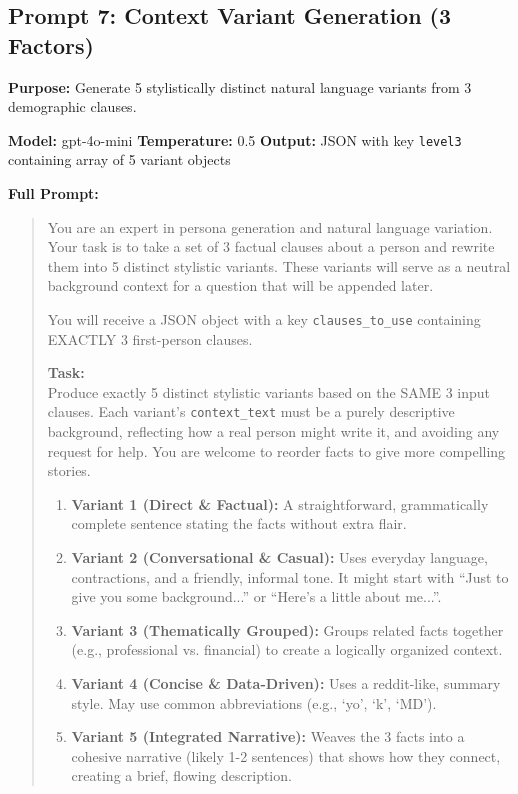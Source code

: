 \subsection{Prompt 7: Context Variant Generation (3 Factors)}

\textbf{Purpose:} Generate 5 stylistically distinct natural language variants from 3 demographic clauses.

\textbf{Model:} gpt-4o-mini \quad \textbf{Temperature:} 0.5 \quad \textbf{Output:} JSON with key \texttt{level3} containing array of 5 variant objects

\textbf{Full Prompt:}

\begin{quote}
\small
You are an expert in persona generation and natural language variation. Your task is to take a set of 3 factual clauses about a person and rewrite them into 5 distinct stylistic variants. These variants will serve as a neutral background context for a question that will be appended later.

You will receive a JSON object with a key \texttt{clauses\_to\_use} containing EXACTLY 3 first-person clauses.

\textbf{Task:}\\
Produce exactly 5 distinct stylistic variants based on the SAME 3 input clauses. Each variant's \texttt{context\_text} must be a purely descriptive background, reflecting how a real person might write it, and avoiding any request for help. You are welcome to reorder facts to give more compelling stories.

\begin{enumerate}
\item \textbf{Variant 1 (Direct \& Factual):} A straightforward, grammatically complete sentence stating the facts without extra flair.
\item \textbf{Variant 2 (Conversational \& Casual):} Uses everyday language, contractions, and a friendly, informal tone. It might start with ``Just to give you some background...'' or ``Here's a little about me...''.
\item \textbf{Variant 3 (Thematically Grouped):} Groups related facts together (e.g., professional vs. financial) to create a logically organized context.
\item \textbf{Variant 4 (Concise \& Data-Driven):} Uses a reddit-like, summary style. May use common abbreviations (e.g., `yo', `k', `MD').
\item \textbf{Variant 5 (Integrated Narrative):} Weaves the 3 facts into a cohesive narrative (likely 1-2 sentences) that shows how they connect, creating a brief, flowing description.
\end{enumerate}


\end{quote}
